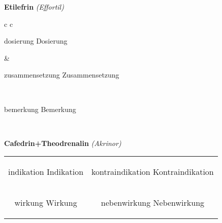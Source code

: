 \documentclass[12pt]{beamer}
\begin{document}
\begin{frame}{
    \textbf{Etilefrin}
    \textit{(Effortil)}
}
    \begin{tabular}{c c}
        \begin{beamercolorbox}[wd=\boxwidth\textwidth,ht=\boxheight\textheight,sep=1em]{dosierung}
        Dosierung
        \end{beamercolorbox} & 
        \begin{beamercolorbox}[wd=\boxwidth\textwidth,ht=\boxheight\textheight,sep=1em]{zusammensetzung}
        Zusammensetzung
        \end{beamercolorbox} \\
        \begin{beamercolorbox}[wd=\textwidth,ht=\boxheight\textheight,sep=1em]{bemerkung}
        Bemerkung
        \end{beamercolorbox} \\
    \end{tabular}
\end{frame}

\begin{frame}{
    \textbf{Cafedrin+Theodrenalin}
    \textit{(Akrinor)}
}
    \begin{tabular}{c c}
        \begin{beamercolorbox}[wd=\boxwidth\textwidth,ht=\boxheight\textheight,sep=1em]{indikation}
        Indikation
        \end{beamercolorbox} & 
        \begin{beamercolorbox}[wd=\boxwidth\textwidth,ht=\boxheight\textheight,sep=1em]{kontraindikation}
        Kontraindikation 
        \end{beamercolorbox} \\
        \begin{beamercolorbox}[wd=\boxwidth\textwidth,ht=\boxheight\textheight,sep=1em]{wirkung}
        Wirkung
        \end{beamercolorbox} & 
        \begin{beamercolorbox}[wd=\boxwidth\textwidth,ht=\boxheight\textheight,sep=1em]{nebenwirkung}
        Nebenwirkung
        \end{beamercolorbox} \\
    \end{tabular}
\end{frame}
\end{document}
